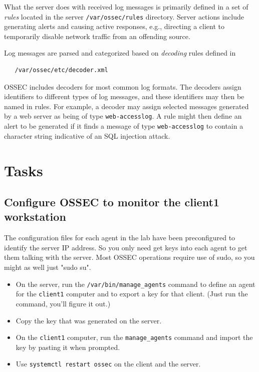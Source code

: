 What the server does with received log messages is primarily defined in a set of \textit{rules} located in the 
server {\tt /var/ossec/rules} 
directory.  Server actions include generating alerts and causing active responses, e.g., directing a client to temporarily disable
network traffic from an offending source.  

Log messages are parsed and categorized based on \textit{decoding} rules defined in 
\begin{verbatim}
   /var/ossec/etc/decoder.xml
\end{verbatim}
\noindent OSSEC includes decoders for most common log formats.  The decoders assign identifiers to different types of log messages,
and these identifiers may then be named in rules.  For example, a decoder may assign selected messages generated by a web
server as being of type {\tt web-accesslog}.  A rule might then define an alert to be generated if it finds a message of 
type {\tt web-accesslog} to contain a character string indicative of an SQL injection attack. 

\section{Tasks}

\subsection{Configure OSSEC to monitor the client1 workstation}
The configuration files for each agent in the lab have been preconfigured to identify the server IP address.  So you only need
get keys into each agent to get them talking with the server.
Most OSSEC operations require use of sudo, so you might as well just "sudo su".
\begin{itemize}
\item On the server, run the {\tt /var/bin/manage\_agents} command to define an agent for the {\tt client1} computer and
to export a key for that client. (Just run the command, you'll figure it out.)
\item Copy the key that was generated on the server.
\item On the {\tt client1} computer, run the {\tt manage\_agents} command and import the key by pasting it when prompted.
\item Use {\tt systemctl restart ossec} on the client and the server.  
\end{itemize}

